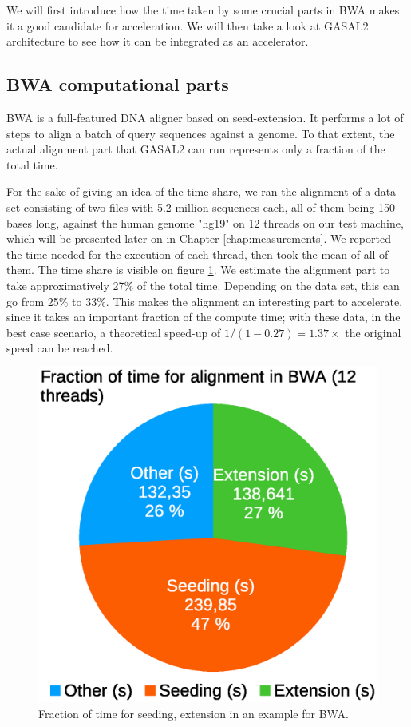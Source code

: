 

We will first introduce how the time taken by some crucial parts in BWA makes it a good candidate for acceleration. We will then take a look at GASAL2 architecture to see how it can be integrated as an accelerator.


\subsection{BWA computational parts}

BWA is a full-featured DNA aligner based on seed-extension. It performs a lot of steps to align a batch of query sequences against a genome. To that extent, the actual alignment part that GASAL2 can run represents only a fraction of the total time.

For the sake of giving an idea of the time share, we ran the alignment of a data set consisting of two files with 5.2 million sequences each, all of them being 150 bases long, against the human genome "hg19" on 12 threads on our test machine, which will be presented later on in Chapter \ref{chap:measurements}. We reported the time needed for the execution of each thread, then took the mean of all of them. The time share is visible on figure \ref{fig:bwatimedivision}. We estimate the alignment part to take approximatively 27\% of the total time. Depending on the data set, this can go from 25\% to 33\%. This makes the alignment an interesting part to accelerate, since it takes an important fraction of the compute time; with these data, in the best case scenario, a theoretical speed-up of $1/\left(1 - 0.27\right) = 1.37\times$ the original speed can be reached.

\begin{figure}[h!]
	\centering
	\includegraphics[width=0.65\linewidth]{bwa_time_division}
	\caption{Fraction of time for seeding, extension in an example for BWA.}
	\label{fig:bwatimedivision}
\end{figure}


